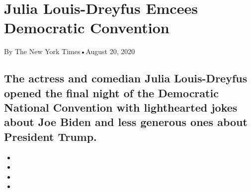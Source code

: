 \hypertarget{julia-louis-dreyfus-emcees-democratic-convention-1}{%
\section{Julia Louis-Dreyfus Emcees Democratic
Convention}\label{julia-louis-dreyfus-emcees-democratic-convention-1}}

By The New York Times•August 20, 2020

\hypertarget{the-actress-and-comedian-julia-louis-dreyfus-opened-the-final-night-of-the-democratic-national-convention-with-lighthearted-jokes-about-joe-biden-and-less-generous-ones-about-president-trump-1}{%
\subsection{The actress and comedian Julia Louis-Dreyfus opened the
final night of the Democratic National Convention with lighthearted
jokes about Joe Biden and less generous ones about President
Trump.}\label{the-actress-and-comedian-julia-louis-dreyfus-opened-the-final-night-of-the-democratic-national-convention-with-lighthearted-jokes-about-joe-biden-and-less-generous-ones-about-president-trump-1}}

\begin{itemize}
\item
\item
\item
\item
\end{itemize}

